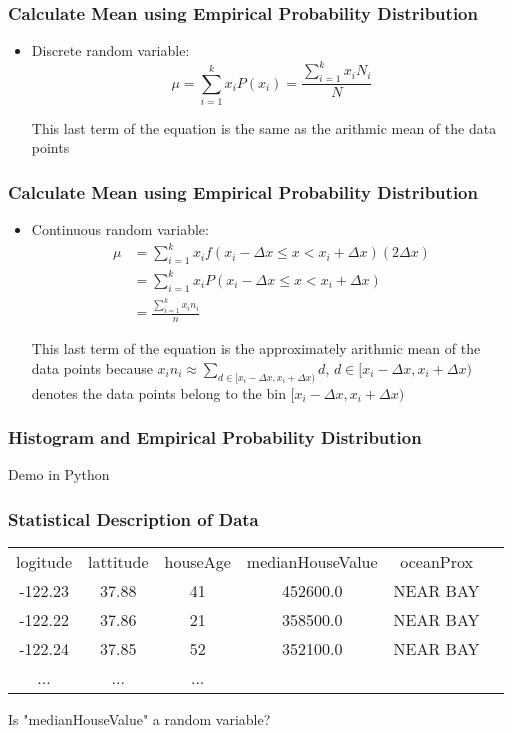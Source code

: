 \documentclass[notheorems, aspectratio=54]{beamer}
\begin{document}
\begin{frame}
\frametitle{Calculate Mean using Empirical Probability Distribution}

\begin{itemize}
\item Discrete random variable: $$\mu=\sum_{i=1}^k x_i P(x_i)=\frac{\sum_{i=1}^k x_i N_i}{N}$$

This last term of the equation is the same as the arithmic mean of the data points

\end{itemize}
\end{frame}



\begin{frame}
\frametitle{Calculate Mean using Empirical Probability Distribution}

\begin{itemize}


\item Continuous random variable:
\begin{align*}
 \mu &= \sum_{i=1}^k x_i f(x_i-\Delta x \leq x < x_i+\Delta x )(2\Delta x)\\
     &=\sum_{i=1}^k x_i P(x_i-\Delta x \leq x < x_i+\Delta x )\\
     &=\frac{\sum_{i=1}^k x_i n_i}{n}
\end{align*}

This last term of the equation is the approximately arithmic mean of the data points because $x_i n_i \approx \sum_{d \in [x_i-\Delta x, x_i+\Delta x)}d$, $d \in [x_i-\Delta x, x_i+\Delta x)$ denotes the data points belong to the bin $[x_i-\Delta x, x_i+\Delta x)$

\end{itemize}

\end{frame}


\begin{frame}
\frametitle{Histogram and Empirical Probability Distribution}
\begin{center}
 Demo in Python
\end{center}
\end{frame}


\begin{frame}
\frametitle{Statistical Description of Data}

\begin{tabular} { c c c c c c}
 logitude & lattitude & houseAge  &medianHouseValue&oceanProx\\ 
-122.23	&37.88	&41 &452600.0	&NEAR BAY\\
-122.22	&37.86	&21	&358500.0	&NEAR BAY\\
-122.24	&37.85	&52 &352100.0	&NEAR BAY\\
... & ... & ... & & &
\end{tabular}

\vspace{5mm}
Is "medianHouseValue" a random variable? 

\end{frame}
\end{document}
